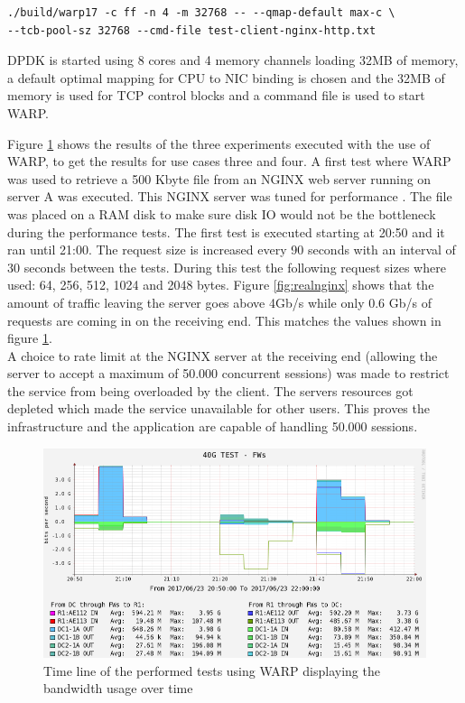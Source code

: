 \begin{verbatim}
./build/warp17 -c ff -n 4 -m 32768 -- --qmap-default max-c \
--tcb-pool-sz 32768 --cmd-file test-client-nginx-http.txt 
\end{verbatim} 

DPDK is started using 8 cores and 4 memory channels loading 32MB of memory, a default optimal mapping for CPU to NIC binding is chosen and the 32MB of memory is used for TCP control blocks and a command file is used to start WARP.

Figure \ref{fig:warptime} shows the results of the three experiments executed with the use of WARP, to get the results for use cases three and four. 
A first test where WARP was used to retrieve a 500 Kbyte file from an NGINX web server running on server A was executed. This NGINX server was tuned for performance \cite{nginxtuning}.
The file was placed on a RAM disk to make sure disk IO would not be the bottleneck during the performance tests. 
The first test is executed starting at 20:50 and it ran until 21:00. The request size is increased every 90 seconds with an interval of 30 seconds between the tests.
During this test the following request sizes where used: 64, 256, 512, 1024 and 2048 bytes. 
Figure \ref{fig:realnginx} shows that the amount of traffic leaving the server goes above 4Gb/s while only 0.6 Gb/s of requests are coming in on the receiving end. 
This matches the values shown in figure \ref{fig:warptime}. \\
A choice to rate limit at the NGINX server at the receiving end (allowing the server to accept a maximum of 50.000 concurrent sessions) was made to restrict the service from being overloaded by the client. The servers resources got depleted which made the service unavailable for other users.
This proves the infrastructure and the application are capable of handling 50.000 sessions.

\begin{figure}[H]
  \includegraphics[scale=0.5]{images/warp-timeline.png}
  \caption{Time line of the performed tests using WARP displaying the bandwidth usage over time}
  \label{fig:warptime}
\end{figure}

